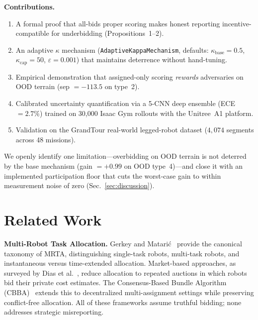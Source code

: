 \documentclass[letterpaper, 10pt, conference]{ieeeconf}
\begin{document}
\textbf{Contributions.}
\begin{enumerate}
  \item A formal proof that all-bids proper scoring makes honest reporting
        incentive-compatible for underbidding (Propositions~1--2).
  \item An adaptive $\kappa$ mechanism (\texttt{AdaptiveKappaMechanism},
        defaults: $\kappa_\text{base}=0.5$, $\kappa_\text{cap}=50$,
        $\varepsilon=0.001$) that maintains deterrence without hand-tuning.
  \item Empirical demonstration that assigned-only scoring \emph{rewards}
        adversaries on OOD terrain (sep $=-113.5$ on type~2).
  \item Calibrated uncertainty quantification via a 5-CNN deep ensemble
        (ECE~$=2.7\%$) trained on 30{,}000 Isaac Gym rollouts with the
        Unitree~A1 platform.
  \item Validation on the GrandTour real-world legged-robot dataset
        ($4{,}074$ segments across 48 missions).
\end{enumerate}

We openly identify one limitation---overbidding on OOD terrain is not deterred
by the base mechanism (gain $=+0.99$ on OOD type~4)---and close it with an
implemented participation floor that cuts the worst-case gain to within
measurement noise of zero (Sec.~\ref{sec:discussion}).

\section{Related Work}
\label{sec:related}

\textbf{Multi-Robot Task Allocation.}
Gerkey and Matari\'{c}~\cite{gerkey2004formal} provide the canonical taxonomy
of MRTA, distinguishing single-task robots, multi-task robots, and
instantaneous versus time-extended allocation.  Market-based approaches, as
surveyed by Dias et al.~\cite{dias2006market}, reduce allocation to repeated
auctions in which robots bid their private cost estimates.  The Consensus-Based
Bundle Algorithm (CBBA)~\cite{choi2009consensus} extends this to decentralized
multi-assignment settings while preserving conflict-free allocation.  All of
these frameworks assume truthful bidding; none addresses strategic
misreporting.
\end{document}
